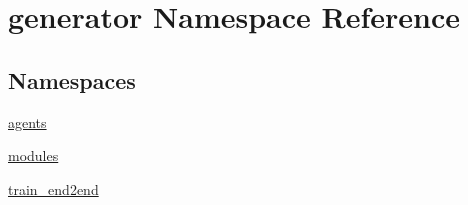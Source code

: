 \hypertarget{namespacegenerator}{}\section{generator Namespace Reference}
\label{namespacegenerator}
\subsection*{Namespaces}
\begin{DoxyCompactItemize}
\item 
 \hyperlink{namespacegenerator_1_1agents}{agents}
\item 
 \hyperlink{namespacegenerator_1_1modules}{modules}
\item 
 \hyperlink{namespacegenerator_1_1train__end2end}{train\+\_\+end2end}
\end{DoxyCompactItemize}
